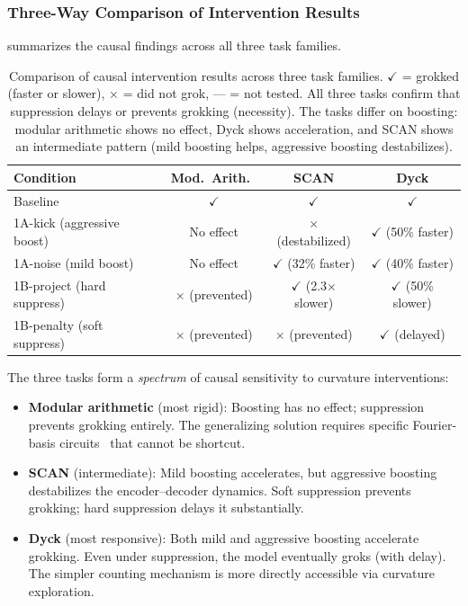 \documentclass[11pt]{article}
\begin{document}
\subsubsection{Three-Way Comparison of Intervention Results}

 summarizes the causal findings across all three task families.

\begin{table}[t]
  \centering
  \caption{Comparison of causal intervention results across three task families. $\checkmark$ = grokked (faster or slower), $\times$ = did not grok, --- = not tested. All three tasks confirm that suppression delays or prevents grokking (necessity). The tasks differ on boosting: modular arithmetic shows no effect, Dyck shows acceleration, and SCAN shows an intermediate pattern (mild boosting helps, aggressive boosting destabilizes).}
  \label{tab:intervention_comparison}
  \small
  \begin{tabular}{@{}lccc@{}}
    \toprule
    Condition & Mod.\ Arith.\ \citep{xu2026integrability} & SCAN & Dyck \\
    \midrule
    Baseline & $\checkmark$ & $\checkmark$ & $\checkmark$ \\
    1A-kick (aggressive boost) & No effect & $\times$ (destabilized) & $\checkmark$ (50\% faster) \\
    1A-noise (mild boost) & No effect & $\checkmark$ (32\% faster) & $\checkmark$ (40\% faster) \\
    1B-project (hard suppress) & $\times$ (prevented) & $\checkmark$ (2.3$\times$ slower) & $\checkmark$ (50\% slower) \\
    1B-penalty (soft suppress) & $\times$ (prevented) & $\times$ (prevented) & $\checkmark$ (delayed) \\
    \bottomrule
  \end{tabular}
\end{table}

The three tasks form a \emph{spectrum} of causal sensitivity to curvature interventions:
\begin{itemize}
  \item \textbf{Modular arithmetic} (most rigid): Boosting has no effect; suppression prevents grokking entirely. The generalizing solution requires specific Fourier-basis circuits~\citep{nanda2023progress} that cannot be shortcut.
  \item \textbf{SCAN} (intermediate): Mild boosting accelerates, but aggressive boosting destabilizes the encoder--decoder dynamics. Soft suppression prevents grokking; hard suppression delays it substantially.
  \item \textbf{Dyck} (most responsive): Both mild and aggressive boosting accelerate grokking. Even under suppression, the model eventually groks (with delay). The simpler counting mechanism is more directly accessible via curvature exploration.
\end{itemize}
\end{document}

